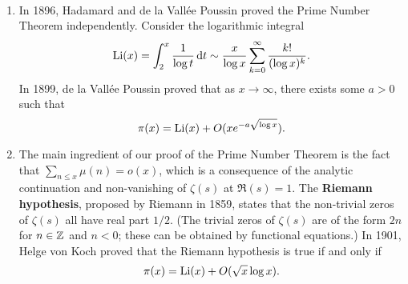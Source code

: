 \begin{remark}\label{remark:3.11}~
    \begin{enumerate}[(1)]
        \item In 1896, Hadamard and de la Vall\'ee Poussin proved the Prime 
        Number Theorem independently. Consider the logarithmic integral 
        \[ \operatorname{Li}(x) = \int_2^x \frac{1}{\log t}\,\mathrm{d} t \sim \frac{x}{\log x} 
        \sum_{k=0}^\infty \frac{k!}{(\log x)^k}. \] 
        In 1899, de la Vall\'ee Poussin proved that as $x \to \infty$, there 
        exists some $a > 0$ such that 
        \[ \pi(x) = \operatorname{Li}(x) + O(xe^{-a\sqrt{\log x}}). \]
        \item The main ingredient of our proof of the Prime Number Theorem is the 
        fact that $\sum_{n\leq x} \mu(n) = o(x)$, which is a consequence of the 
        analytic continuation and non-vanishing of $\zeta(s)$ at $\Re(s) = 1$. 
        The {\bf Riemann hypothesis}, proposed by Riemann in 1859, states that 
        the non-trivial zeros of $\zeta(s)$ all have real part $1/2$. 
        (The trivial zeros of $\zeta(s)$ are of the form $2n$ for $n \in \mathbb{Z}$ and 
        $n < 0$; these can be obtained by functional equations.) In 1901, Helge von 
        Koch proved that the Riemann hypothesis is true if and only if 
        \[ \pi(x) = \operatorname{Li}(x) + O(\sqrt x \log x). \] 
    \end{enumerate}
\end{remark}
